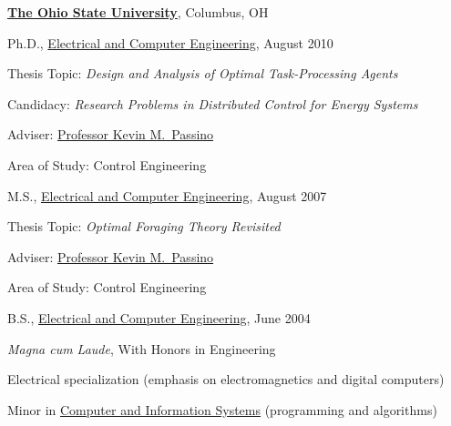 \documentclass[10pt]{article}           %
\renewcommand{\section}[1]{\pagebreak[3]%
    \vspace{1.3\baselineskip}%
    \ifdefined\UseTaggingSocket
        \UseTaggingSocket{sec/end}{1}%
        \UseTaggingSocket{sec/begin}{{1}{tag=\UseStructureName{sec/1}}}%
    \fi
    \phantomsection\addcontentsline{toc}{section}{#1}%
    \begingroup
    \ifdefined\UseTaggingSocket
        \UseTaggingSocket{sec/title/init}{1}%
    \fi
    \noindent\llap{\scshape\smash{\parbox[t]{\marginparwidth}{\hyphenpenalty=10000\raggedright #1}}}%
    \vspace{-\baselineskip}\par
    \endgroup}
\newcommand{\entry}{\item[{}]}
\begin{document}
\href{http://www.osu.edu/}{\textbf{The Ohio State University}},
Columbus, OH
\begin{cvlist}[loose]

    \entry Ph.D.,
            \href{http://www.ece.osu.edu/}
                 {Electrical and Computer Engineering},
                 August 2010
    \begin{cvlist}
        \item Thesis Topic: \emph{Design and Analysis of Optimal
            Task-Processing Agents}
        \item Candidacy: \emph{Research
            Problems in Distributed Control for Energy Systems}
        \item Adviser:
              \href{http://www.ece.osu.edu/~passino/}
                   {Professor Kevin M.~Passino}
        \item Area of Study: Control Engineering
    \end{cvlist}

    \entry M.S.,
            \href{http://www.ece.osu.edu/}
                 {Electrical and Computer Engineering}, August 2007
    \begin{cvlist}
        \item Thesis Topic: \emph{Optimal Foraging Theory Revisited}
        \item Adviser:
              \href{http://www.ece.osu.edu/~passino/}
                   {Professor Kevin M.~Passino}
        \item Area of Study: Control Engineering
    \end{cvlist}

    \entry B.S.,
            \href{http://www.ece.osu.edu/}
                 {Electrical and Computer Engineering}, June 2004
    \begin{cvlist}
        \item \emph{Magna cum Laude}, With Honors in Engineering
        \item Electrical specialization (emphasis on electromagnetics and digital computers)
        \item Minor in \href{http://www.cse.ohio-state.edu/}
                            {Computer and Information Systems}
              (programming and algorithms)
    \end{cvlist}

\end{cvlist}

%
\end{document}
